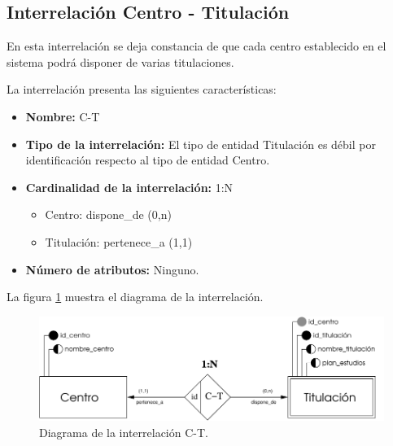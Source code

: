 \subsection{Interrelación Centro - Titulación}

   \begin{description}
      \item[Definición] En esta interrelación se deja constancia de que cada
      centro establecido en el sistema podrá disponer de varias titulaciones.

      \item[Características] La interrelación presenta las siguientes
                             características:

         \begin{itemize}
            \item \textbf{Nombre:} C-T
            \item \textbf{Tipo de la interrelación:} El tipo de entidad
                  Titulación es débil por identificación respecto al tipo de
                  entidad Centro.
            \item \textbf{Cardinalidad de la interrelación:} 1:N
                  \begin{itemize}
                     \item Centro: dispone\_de (0,n)
                     \item Titulación: pertenece\_a (1,1)
                  \end{itemize}
            \item \textbf{Número de atributos:} Ninguno.
         \end{itemize}

      \item[Diagrama] La figura \ref{diagramaC-T} muestra el diagrama de la
                      interrelación.
      \item \begin{figure}[!ht]
            \begin{center}
            \includegraphics[]{07.Modelo_Entidad-Interrelacion/7.3.Analisis_Interrelaciones/diagramas/C-T.pdf}
            \caption{Diagrama de la interrelación C-T.}
            \label{diagramaC-T}
            \end{center}
         \end{figure}


\end{description}
